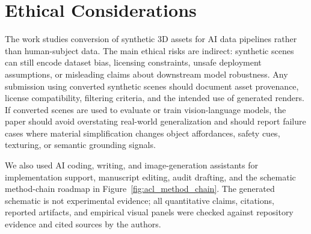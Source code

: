 \section*{Ethical Considerations}

The work studies conversion of synthetic 3D assets for AI data pipelines rather
than human-subject data. The main ethical risks are indirect: synthetic scenes
can still encode dataset bias, licensing constraints, unsafe deployment
assumptions, or misleading claims about downstream model robustness. Any
submission using converted synthetic scenes should document asset provenance,
license compatibility, filtering criteria, and the intended use of generated
renders. If converted scenes are used
to evaluate or train vision-language models, the paper should avoid overstating
real-world generalization and should report failure cases where material
simplification changes object affordances, safety cues, texturing, or semantic
grounding signals.

We also used AI coding, writing, and image-generation assistants for
implementation support, manuscript editing, audit drafting, and the schematic
method-chain roadmap in Figure~\ref{fig:acl_method_chain}. The generated
schematic is not experimental evidence; all quantitative claims, citations,
reported artifacts, and empirical visual panels were checked against repository
evidence and cited sources by the authors.
